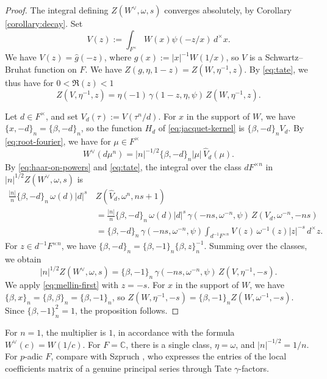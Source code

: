 \documentclass[reqno]{amsart}
\theoremstyle{plain}
\theoremstyle{definition}
\theoremstyle{itplain}
\numberwithin{equation}{section}
\numberwithin{theorem}{section}
\begin{document}
\begin{proof}
  The integral defining $Z(W^\vee, \omega, s)$ converges absolutely, by Corollary \ref{corollary:decay}.  Set
  \begin{equation*}
    V(z) := \int_{F^\times} W(x) \psi(- z / x) \, d^\times x.
  \end{equation*}
  We have $V(z) = \hat{g}(-z)$, where $g(x) := \lvert x \rvert^{-1} W(1/x)$, so $V$ is a Schwartz--Bruhat function on $F$.  We have $Z(g, \eta, 1 - z) = Z(W, \eta^{-1}, z)$.  By \eqref{eq:tate}, we thus have for $0 < \Re(z) < 1$
  \begin{equation}\label{eq:mellin-first}
    Z(V, \eta^{-1}, z) = \eta(-1) \, \gamma(1 - z, \eta, \psi) \, Z(W, \eta^{-1}, z).
  \end{equation}

  Let $d \in F^\times$, and set $V_d(\tau) := V(\tau^n / d)$.  For $x$ in the support of $W$, we have $\{x, -d\}_n = \{\beta, -d\}_n$, so the function $H_d$ of \eqref{eq:jacquet-kernel} is $\{\beta, -d\}_n V_d$.  By \eqref{eq:root-fourier}, we have for $\mu \in F^\times$
  \begin{equation*}
    W^\vee(d \mu^n) = \lvert n \rvert^{-1/2} \{\beta, -d\}_n \lvert \mu \rvert \, \hat{V}_d(\mu).
  \end{equation*}
  By \eqref{eq:haar-on-powers} and \eqref{eq:tate}, the integral over the class $d F^{\times n}$ in $\lvert n \rvert^{1/2} Z(W^\vee, \omega, s)$ is
  \begin{align*}
    \tfrac{\lvert n \rvert}{n} \{\beta, -d\}_n \, \omega(d) \lvert d \rvert^s \,
    &Z(\hat{V}_d, \omega^n, n s + 1) \\
    &= \tfrac{\lvert n \rvert}{n} \{\beta, -d\}_n \, \omega(d) \lvert d \rvert^s \, \gamma(- n s, \omega^{-n}, \psi) \, Z(V_d, \omega^{-n}, - n s) \\
    &= \{\beta, -d\}_n \, \gamma(- n s, \omega^{-n}, \psi) \int_{d^{-1} F^{\times n}} V(z) \, \omega^{-1}(z) \lvert z \rvert^{-s} \, d^\times z.
  \end{align*}
  For $z \in d^{-1} F^{\times n}$, we have $\{\beta, -d\}_n = \{\beta, -1\}_n \{\beta, z\}_n^{-1}$.  Summing over the classes, we obtain
  \begin{equation*}
    \lvert n \rvert^{1/2} Z(W^\vee, \omega, s) = \{\beta, -1\}_n \, \gamma(- n s, \omega^{-n}, \psi) \, Z(V, \eta^{-1}, - s).
  \end{equation*}
  We apply \eqref{eq:mellin-first} with $z = -s$.  For $x$ in the support of $W$, we have $\{\beta, x\}_n = \{\beta, \beta\}_n = \{\beta, -1\}_n$, so $Z(W, \eta^{-1}, -s) = \{\beta, -1\}_n Z(W, \omega^{-1}, -s)$.  Since $\{\beta, -1\}_n^2 = 1$, the proposition follows.
\end{proof}
For $n = 1$, the multiplier is $1$, in accordance with the formula $W^\vee(c) = W(1/c)$.  For $F = \mathbb{C}$, there is a single class, $\eta = \omega$, and $\lvert n \rvert^{-1/2} = 1/n$.  For $p$-adic $F$, compare with Szpruch \cite{Szpruch2019}, who expresses the entries of the local coefficients matrix of a genuine principal series through Tate $\gamma$-factors.
\end{document}
